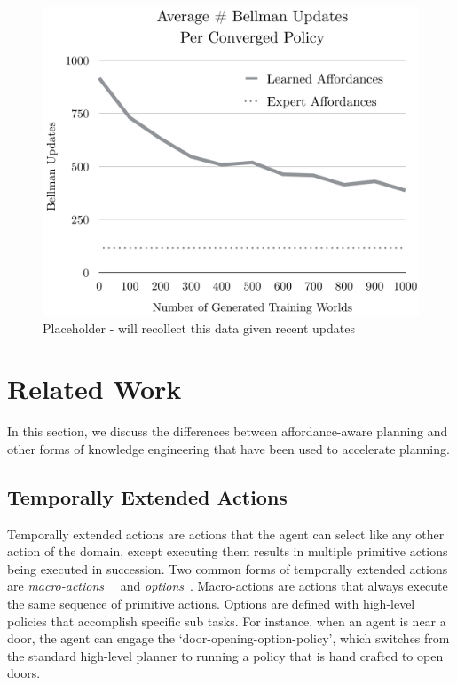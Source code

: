 \documentclass[conference]{IEEEtran}
\begin{document}
\begin{figure}[H]
\centering
\includegraphics[scale=0.195]{figures/training_results.png}%
  \caption{Placeholder - will recollect this data given recent updates}
  \label{fig:training_results}
\end{figure}

\section{Related Work}
\label{sec:related-work}

In this section, we discuss the differences between
affordance-aware planning and other forms of knowledge engineering that
have been used to accelerate planning.

\subsection{Temporally Extended Actions}
Temporally extended actions are actions that the agent can
select like any other action of the domain, except executing them
results in multiple primitive actions being executed in
succession. Two common forms of temporally extended actions are {\em
  macro-actions}~\cite{hauskrecht98} ~and {\em options}~\cite{sutton99}. 
Macro-actions are actions that always
execute the same sequence of primitive actions. Options are defined
with high-level policies that accomplish specific sub tasks. For
instance, when an agent is near a door, the agent can engage the
`door-opening-option-policy', which switches from the standard
high-level planner to running a policy that is hand crafted to open
doors. 
\end{document}
